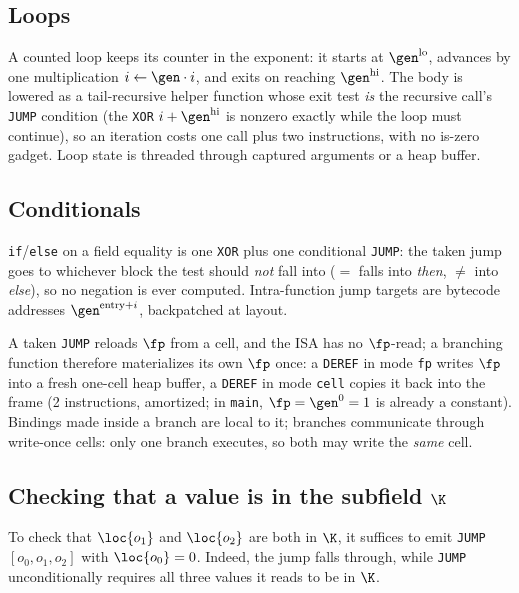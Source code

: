 \subsection{Loops}\label{sec:prog-loops}

A counted loop keeps its counter in the exponent: it starts at $\gen^{\mathrm{lo}}$, advances by one multiplication $i\gets\gen\cdot i$, and exits on reaching $\gen^{\mathrm{hi}}$. The body is lowered as a tail-recursive helper function whose exit test \emph{is} the recursive call's \texttt{JUMP} condition (the \texttt{XOR} $i+\gen^{\mathrm{hi}}$ is nonzero exactly while the loop must continue), so an iteration costs one call plus two instructions, with no is-zero gadget. Loop state is threaded through captured arguments or a heap buffer.

\subsection{Conditionals}\label{sec:prog-conditionals}

\texttt{if}/\texttt{else} on a field equality is one \texttt{XOR} plus one conditional \texttt{JUMP}: the taken jump goes to whichever block the test should \emph{not} fall into ($=$ falls into \emph{then}, $\neq$ into \emph{else}), so no negation is ever computed. Intra-function jump targets are bytecode addresses $\gen^{\mathrm{entry}+i}$, backpatched at layout.

A taken \texttt{JUMP} reloads $\fp$ from a cell, and the ISA has no $\fp$-read; a branching function therefore materializes its own $\fp$ once: a \texttt{DEREF} in mode \texttt{fp} writes $\fp$ into a fresh one-cell heap buffer, a \texttt{DEREF} in mode \texttt{cell} copies it back into the frame (2 instructions, amortized; in \texttt{main}, $\fp=\gen^{0}=1$ is already a constant). Bindings made inside a branch are local to it; branches communicate through write-once cells: only one branch executes, so both may write the \emph{same} cell.

\subsection{Checking that a value is in the subfield \texorpdfstring{$\K$}{K}}\label{sec:prog-subfield-checks}

To check that $\loc{o_1}$ and $\loc{o_2}$ are both in $\K$, it suffices to emit \texttt{JUMP} $[o_0,o_1,o_2]$ with $\loc{o_0}=0$. Indeed, the jump falls through, while \texttt{JUMP} unconditionally requires all three values it reads to be in $\K$.

